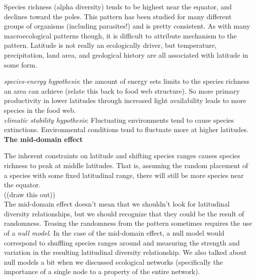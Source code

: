 \documentclass[12pt]{article}
\begin{document}
Species richness (alpha diversity) tends to be highest near the equator, and declines toward the poles. This pattern has been studied for many different groups of organisms (including parasites!) and is pretty consistent. As with many macroecological patterns though, it is difficult to attribute mechanism to the pattern. Latitude is not really an ecologically driver, but temperature, precipitation, land area, and geological history are all associated with latitude in some form. 

\textit{species-energy hypothesis}: the amount of energy sets limits to the species richness an area can achieve (relate this back to food web structure). So more primary productivity in lower latitudes through increased light availability leads to more species in the food web.  \\

\textit{climatic stability hypothesis}: Fluctuating environments tend to cause species extinctions. Environmental conditions tend to fluctuate more at higher latitudes. \\


\textbf{The mid-domain effect}

The inherent constraints on latitude and shifting species ranges causes species richness to peak at middle latitudes. That is, assuming the random placement of a species with some fixed latitudinal range, there will still be more species near the equator. \\




((draw this out)) \\






The mid-domain effect doesn't mean that we shouldn't look for latitudinal diversity relationships, but we should recognize that they could be the result of randomness. Teasing the randomness from the pattern sometimes requires the use of a \textit{null model}. In the case of the mid-domain effect, a null model would correspond to shuffling species ranges around and measuring the strength and variation in the resulting latitudinal diversity relationship. We also talked about null models a bit when we discussed ecological networks (specifically the importance of a single node to a property of the entire network). 







\bigskip
\end{document}
